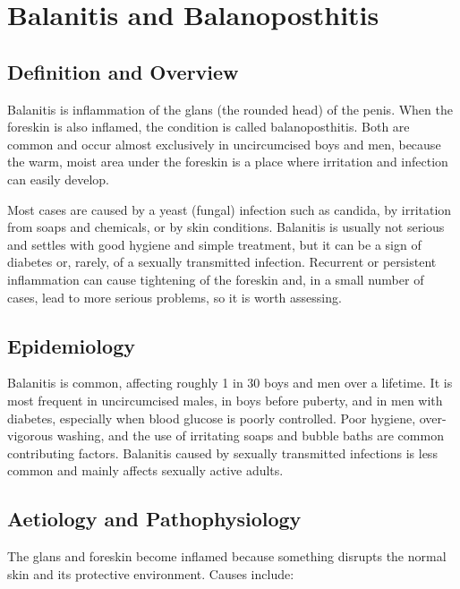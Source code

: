 \chapter{Balanitis and Balanoposthitis}

\section*{Definition and Overview}
Balanitis is inflammation of the glans (the rounded head) of the penis. When the foreskin is also inflamed, the condition is called balanoposthitis. Both are common and occur almost exclusively in uncircumcised boys and men, because the warm, moist area under the foreskin is a place where irritation and infection can easily develop.

Most cases are caused by a yeast (fungal) infection such as candida, by irritation from soaps and chemicals, or by skin conditions. Balanitis is usually not serious and settles with good hygiene and simple treatment, but it can be a sign of diabetes or, rarely, of a sexually transmitted infection. Recurrent or persistent inflammation can cause tightening of the foreskin and, in a small number of cases, lead to more serious problems, so it is worth assessing.

\section*{Epidemiology}
Balanitis is common, affecting roughly 1 in 30 boys and men over a lifetime. It is most frequent in uncircumcised males, in boys before puberty, and in men with diabetes, especially when blood glucose is poorly controlled. Poor hygiene, over-vigorous washing, and the use of irritating soaps and bubble baths are common contributing factors. Balanitis caused by sexually transmitted infections is less common and mainly affects sexually active adults.

\section*{Aetiology and Pathophysiology}
The glans and foreskin become inflamed because something disrupts the normal skin and its protective environment. Causes include:

